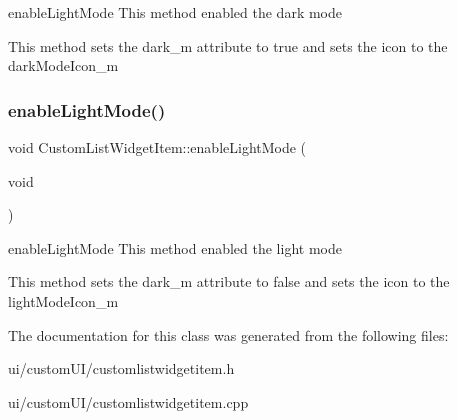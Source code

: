 enable\+Light\+Mode This method enabled the dark mode 

This method sets the dark\+\_\+m attribute to true and sets the icon to the dark\+Mode\+Icon\+\_\+m \mbox{\label{class_custom_list_widget_item_a71d6b28f6e542c450807f2277ddacdc4}} 
\subsubsection{\texorpdfstring{enable\+Light\+Mode()}{enableLightMode()}}
{\footnotesize\ttfamily void Custom\+List\+Widget\+Item\+::enable\+Light\+Mode (\begin{DoxyParamCaption}\item[{void}]{ }\end{DoxyParamCaption})}



enable\+Light\+Mode This method enabled the light mode 

This method sets the dark\+\_\+m attribute to false and sets the icon to the light\+Mode\+Icon\+\_\+m 

The documentation for this class was generated from the following files\+:\begin{DoxyCompactItemize}
\item 
ui/custom\+U\+I/customlistwidgetitem.\+h\item 
ui/custom\+U\+I/customlistwidgetitem.\+cpp\end{DoxyCompactItemize}
